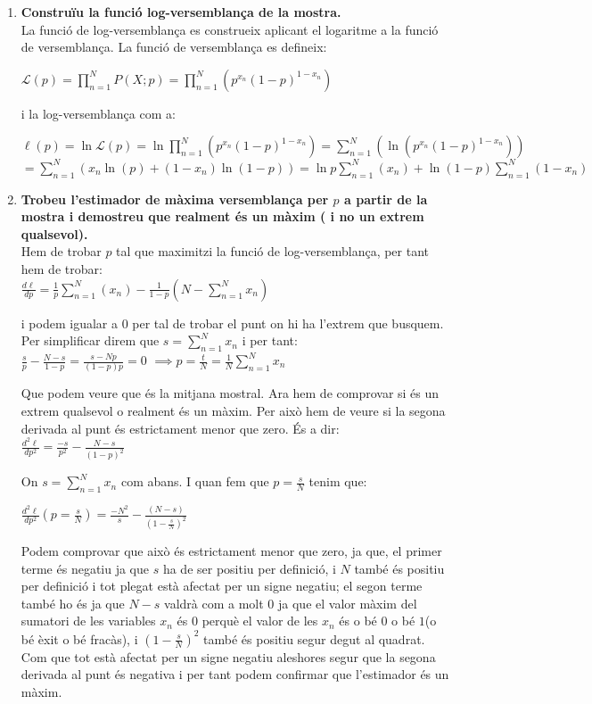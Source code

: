 \documentclass[a4paper]{article}
\begin{document}
\begin{enumerate}
	\item\textbf{ Construïu la funció log-versemblança de la mostra.}\\
	La funció de log-versemblança es construeix aplicant el logaritme a la funció de versemblança. La funció de versemblança es defineix:
	
	$\mathcal{L}(p)=\prod_{n=1}^{N} P(X;p) = \prod_{n=1}^{N}\left( p^{x_n} (1-p)^{1-x_n} \right)$
	
	i la log-versemblança com a:
	
	$\ell (p) = \ln \mathcal{L}(p) = \ln \prod_{n=1}^{N}\left( p^{x_n}(1-p)^{1-x_n}\right) = \sum_{n=1}^{N}\left(\ln ( p^{x_n} (1-p)^{1-x_n})\right) $\\
	$= \sum_{n=1}^{N}\left(x_n \ln(p) + (1 -x_n )\ln(1-p)\right) =\boxed{ \ln p \sum_{n=1}^{N} (x_n) + \ln (1-p) \sum_{n=1}^{N}( 1 -x_n)} $
	
	\item\textbf{ Trobeu l'estimador de màxima versemblança per $p$ a partir de la mostra i demostreu que realment és un màxim ( i no un extrem qualsevol).}\\
	Hem de trobar $p$ tal que maximitzi la funció de log-versemblança, per tant hem de trobar:\\
	
	$\frac{d\ell}{dp} = \frac{1}{p} \sum_{n=1}^{N}(x_n) - \frac{1}{1-p}\left(N-\sum_{n=1}^{N} x_n\right)$
	
	i podem igualar a $0$ per tal de trobar el punt on hi ha l'extrem que busquem. Per simplificar direm que  $s =\sum_{n=1}^{N}x_n$ i per tant:\\
	
	$\frac{s}{p} - \frac{N-s}{1 - p} = \frac{s - Np}{(1-p)p} = 0$ 
	$\implies p = \frac{t}{N} = \boxed{\frac{1}{N}\sum_{n=1}^{N}x_n}$
	
	Que podem veure que és la mitjana mostral. Ara hem de comprovar si és un extrem qualsevol o realment és un màxim. Per això hem de veure si la segona derivada al punt és estrictament menor que zero. És a dir:\\

	$\frac{d^2\ell}{dp^2} = \frac{-s}{p^2} - \frac{N-s}{(1-p)^2}  $
	
	On $s = \sum_{n=1}^{N}x_n$ com abans. I quan fem que $p = \frac{s}{N}$ tenim que:
	
	$\frac{d^2\ell}{dp^2} \left(p=\frac{s}{N}\right) = \frac{-N^2}{s} - \frac{(N-s)}{(1-\frac{s}{N})^2}$
	
	Podem comprovar que això és estrictament menor que zero, ja que, el primer terme és negatiu ja que $s$ ha de ser positiu per definició, i $N$ també és positiu per definició i tot plegat està afectat per un signe negatiu; el segon terme també ho és ja que $N-s$ valdrà com a molt $0$ ja que el valor màxim del sumatori de les variables $x_n$ és $0$ perquè el valor de les $x_n$ és o bé $0$ o bé $1$(o bé èxit o bé fracàs), i $(1 - \frac{s}{N})^2$ també és positiu segur degut al quadrat. Com que tot està afectat per un signe negatiu aleshores segur que la segona derivada al punt és negativa i per tant podem confirmar que l'estimador és un màxim.
		

\end{enumerate}
\end{document}

